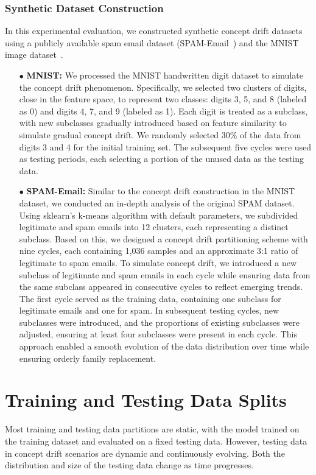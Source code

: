 \documentclass[lettersize,journal]{IEEEtran}
\begin{document}
\subsubsection{Synthetic Dataset Construction}
\label{Sec: Synthetic Concept Drift Dataset Construction}
In this experimental evaluation, we constructed synthetic concept drift datasets using a publicly available spam email dataset (SPAM-Email~\cite{2010-Spam-Emali-dataset}) and the MNIST image dataset~\cite{2017-MINIST-dataset}.

\begin{itemize}[leftmargin=*]
	\item[$\bullet$] \textbf{MNIST:} 
	We processed the MNIST handwritten digit dataset to simulate the concept drift phenomenon. 
	Specifically, we selected two clusters of digits, close in the feature space, to represent two classes: digits 3, 5, and 8 (labeled as 0) and digits 4, 7, and 9 (labeled as 1).
	Each digit is treated as a subclass, with new subclasses gradually introduced based on feature similarity to simulate gradual concept drift.
	We randomly selected 30\% of the data from digits 3 and 4 for the initial training set.
	The subsequent five cycles were used as testing periods, each selecting a portion of the unused data as the testing data.
	
	\item[$\bullet$] \textbf{SPAM-Email:} 
	Similar to the concept drift construction in the MNIST dataset, we conducted an in-depth analysis of the original SPAM dataset.
	Using sklearn's k-means algorithm with default parameters, we subdivided legitimate and spam emails into 12 clusters, each representing a distinct subclass.
	Based on this, we designed a concept drift partitioning scheme with nine cycles, each containing 1,036 samples and an approximate 3:1 ratio of legitimate to spam emails.
	To simulate concept drift, we introduced a new subclass of legitimate and spam emails in each cycle while ensuring data from the same subclass appeared in consecutive cycles to reflect emerging trends.
	The first cycle served as the training data, containing one subclass for legitimate emails and one for spam. In subsequent testing cycles, new subclasses were introduced, and the proportions of existing subclasses were adjusted, ensuring at least four subclasses were present in each cycle.
	This approach enabled a smooth evolution of the data distribution over time while ensuring orderly family replacement.
\end{itemize}

\section*{Training and Testing Data Splits}
\label{Sec: Training and Testing Data Splits}
Most training and testing data partitions are static, with the model trained on the training dataset and evaluated on a fixed testing data.
However, testing data in concept drift scenarios are dynamic and continuously evolving.
Both the distribution and size of the testing data change as time progresses.
\end{document}

